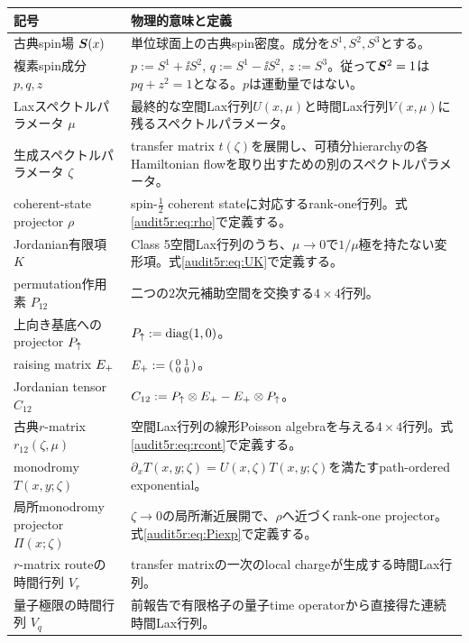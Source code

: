 \begin{longtable}{L{39mm}L{105mm}}
\toprule
記号 & 物理的意味と定義\\
\midrule
\endhead
古典spin場 $\boldsymbol S(x)$ & 単位球面上の古典spin密度。成分を$S^1,S^2,S^3$とする。\\
複素spin成分 $p,q,z$ & $p:=S^1+\ii S^2$, $q:=S^1-\ii S^2$, $z:=S^3$。従って$\boldsymbol S^2=1$は$pq+z^2=1$となる。$p$は運動量ではない。\\
Laxスペクトルパラメータ $\mu$ & 最終的な空間Lax行列$U(x,\mu)$と時間Lax行列$V(x,\mu)$に残るスペクトルパラメータ。\\
生成スペクトルパラメータ $\zeta$ & transfer matrix $t(\zeta)$を展開し、可積分hierarchyの各Hamiltonian flowを取り出すための別のスペクトルパラメータ。\\
coherent-state projector $\rho$ & spin-$\tfrac12$ coherent stateに対応するrank-one行列。式\eqref{audit5r:eq:rho}で定義する。\\
Jordanian有限項 $K$ & Class 5空間Lax行列のうち、$\mu\to0$で$1/\mu$極を持たない変形項。式\eqref{audit5r:eq:UK}で定義する。\\
permutation作用素 $P_{12}$ & 二つの$2$次元補助空間を交換する$4\times4$行列。\\
上向き基底へのprojector $P_{\uparrow}$ & $P_{\uparrow}:=\operatorname{diag}(1,0)$。\\
raising matrix $E_{+}$ & $E_{+}:=\begin{psmallmatrix}0&1\\0&0\end{psmallmatrix}$。\\
Jordanian tensor $C_{12}$ & $C_{12}:=P_{\uparrow}\otimes E_{+}-E_{+}\otimes P_{\uparrow}$。\\
古典$r$-matrix $r_{12}(\zeta,\mu)$ & 空間Lax行列の線形Poisson algebraを与える$4\times4$行列。式\eqref{audit5r:eq:rcont}で定義する。\\
monodromy $T(x,y;\zeta)$ & $\partial_xT(x,y;\zeta)=U(x,\zeta)T(x,y;\zeta)$を満たすpath-ordered exponential。\\
局所monodromy projector $\Pi(x;\zeta)$ & $\zeta\to0$の局所漸近展開で、$\rho$へ近づくrank-one projector。式\eqref{audit5r:eq:Piexp}で定義する。\\
$r$-matrix routeの時間行列 $V_r$ & transfer matrixの一次のlocal chargeが生成する時間Lax行列。\\
量子極限の時間行列 $V_q$ & 前報告で有限格子の量子time operatorから直接得た連続時間Lax行列。\\
\bottomrule
\end{longtable}

